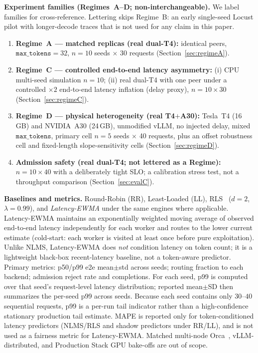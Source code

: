 \documentclass[pdflatex,sn-mathphys-num]{sn-jnl}
\begin{document}
\textbf{Experiment families (Regimes~A--D; non-interchangeable).}
We label families for cross-reference. Lettering skips Regime~B: an early single-seed
Locust pilot with longer-decode traces that is not used for any claim in this paper.
\begin{enumerate}
\item \textbf{Regime~A --- matched replicas (real dual-T4):}
  identical peers, $\texttt{max\_tokens}{=}32$, $n{=}10$ seeds $\times$ 30 requests
  (Section~\ref{sec:regimeA}).
\item \textbf{Regime~C --- controlled end-to-end latency asymmetry:}
  (i) CPU multi-seed simulation $n{=}10$; (ii) real dual-T4 with one peer under a
  controlled $\times 2$ end-to-end latency inflation (delay proxy), $n{=}10\times 30$
  (Section~\ref{sec:regimeC}).
\item \textbf{Regime~D --- physical heterogeneity (real T4$+$A30):}
  Tesla~T4 (16\,GB) and NVIDIA~A30 (24\,GB), unmodified vLLM, no injected delay, mixed
  $\texttt{max\_tokens}$, primary cell $n{=}5$ seeds $\times$ 40 requests, plus an
  offset robustness cell and fixed-length slope-sensitivity cells
  (Section~\ref{sec:regimeD}).
\item \textbf{Admission safety (real dual-T4; not lettered as a Regime):}
  $n{=}10\times 40$ with a deliberately tight SLO; a calibration stress test, not a
  throughput comparison (Section~\ref{sec:evalC}).
\end{enumerate}

\textbf{Baselines and metrics.} Round-Robin (RR), Least-Loaded (LL),
RLS~\cite{haykin2002adaptive} ($d{=}2$, $\lambda{=}0.99$), and
\emph{Latency-EWMA} under the same engines where applicable.
Latency-EWMA maintains an exponentially weighted moving average of observed
end-to-end latency independently for each worker and routes to the lower current
estimate (cold-start: each worker is visited at least once before pure
exploitation). Unlike NLMS, Latency-EWMA does \emph{not} condition latency on
token count; it is a lightweight black-box recent-latency baseline, not a
token-aware predictor. Primary metrics: p50/p99 e2e mean$\pm$std across seeds;
routing fraction to each backend; admission reject rate and completions.
For each seed, p99 is computed over that seed's request-level latency
distribution; reported mean$\pm$SD then summarizes the per-seed p99 across seeds.
Because each seed contains only $30$--$40$ sequential requests, p99 is a per-run
tail indicator rather than a high-confidence stationary production tail estimate.
MAPE is reported only for token-conditioned latency predictors (NLMS/RLS and
shadow predictors under RR/LL), and is not used as a fairness metric for
Latency-EWMA. Matched multi-node Orca~\cite{orca}, vLLM-distributed, and Production
Stack GPU bake-offs are out of scope.
\end{document}
